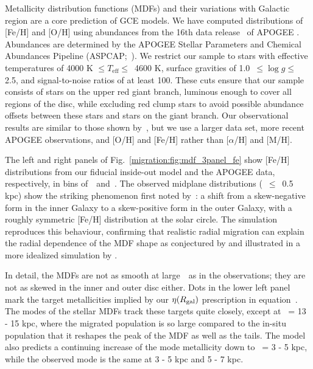 Metallicity distribution functions (MDFs) and their variations with Galactic 
region are a core prediction of GCE models. 
We have computed distributions of [Fe/H] and [O/H] using abundances from the 
16th data release~\citep[DR16;][]{Ahumada2020, Joensson2020} of APOGEE 
\citep{Majewski2017}. 
Abundances are determined by the APOGEE Stellar Parameters and Chemical 
Abundances Pipeline (ASPCAP;~\citealp{Holtzman2015, GarciaPerez2016}). 
We restrict our sample to stars with effective temperatures of 4000 K 
$\leq T_\text{eff} \leq$~4600 K, surface gravities of 1.0~$\leq \log g \leq$ 
2.5, and signal-to-noise ratios of at least 100. 
These cuts ensure that our sample consists of stars on the upper red giant 
branch, luminous enough to cover all regions of the disc, while excluding red 
clump stars to avoid possible abundance offsets between these stars and stars 
on the giant branch. 
Our observational results are similar to those shown by~\citet{Hayden2015}, 
but we use a larger data set, more recent APOGEE observations, and [O/H] and 
[Fe/H] rather than [$\alpha$/H] and [M/H]. 
\par 
The left and right panels of Fig.~\ref{migration:fig:mdf_3panel_fe} show [Fe/H] 
distributions from our fiducial inside-out model and the APOGEE data, 
respectively, in bins of~\rgal~and~\absz. 
The observed midplane distributions (\absz~$\leq$~0.5 kpc) show the striking 
phenomenon first noted by~\citet{Hayden2015}: a shift from a skew-negative form 
in the inner Galaxy to a skew-positive form in the outer Galaxy, with a roughly 
symmetric [Fe/H] distribution at the solar circle. 
The simulation reproduces this behaviour, confirming that realistic radial 
migration can explain the radial dependence of the MDF shape as conjectured by 
\citet{Hayden2015} and illustrated in a more idealized simulation by 
\citet{Loebman2016}. 
\par 
In detail, the MDFs are not as smooth at large~\rgal~as in the observations; 
they are not as skewed in the inner and outer disc either. 
Dots in the lower left panel mark the target metallicities implied by our 
$\eta(R_\text{gal})$ prescription in equation~. 
The modes of the stellar MDFs track these targets quite closely, except at 
\rgal~= 13 - 15 kpc, where the migrated population is so large compared to the 
in-situ population that it reshapes the peak of the MDF as well as the tails. 
The model also predicts a continuing increase of the mode metallicity down to 
\rgal~= 3 - 5 kpc, while the observed mode is the same at 3 - 5 kpc and 5 - 7 
kpc. 
